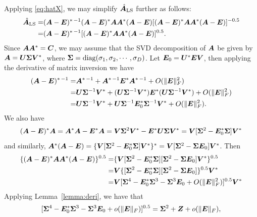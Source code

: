 


Applying \eqref{eq:hatX}, we may simplify $\hat{\bA}_{\text{LS}}$ further as follows:
\begin{align}
\hat{\bA}_{\text{LS}}=&(\bA-\bE)^{*\,-1}(\bA-\bE)^*\bA\bA^*(\bA-\bE)[(\bA-\bE)^*\bA\bA^*(\bA-\bE)]^{-0.5}
\nonumber\\=&(\bA-\bE)^{*\,-1}[(\bA-\bE)^*\bA\bA^*(\bA-\bE)]^{0.5}.\label{eq:expression1}
\end{align}
Since $\bA\bA^*=\bC$, we may assume that the SVD decomposition of $\bA$ be given by $\bA=\bU\bSigma\bV^*$, where $\bSigma=\diag(\sigma_1, \sigma_2, \cdots, \sigma_D)$. Let $\bE_0=\bU^*\bE\bV$, then applying the derivative of matrix inversion we have
\begin{align}\nonumber
(\bA-\bE)^{*\,-1}= &\bA^{*\,-1} + \bA^{*\,-1}\bE^* \bA^{*\,-1} + O(\|\bE\|_F^2)\\\nonumber=& \bU\bSigma^{-1}\bV^* + (\bU\bSigma^{-1}\bV^*)\bE^*(\bU\bSigma^{-1}\bV^*)  + O(\|\bE\|_F^2)\\=&  \bU\bSigma^{-1}\bV^* +\bU\bSigma^{-1}\bE_0^*\bSigma^{-1}\bV^* + O(\|\bE\|_F^2). \label{eq:expression2}
\end{align}
We also have
\begin{align*}
(\bA-\bE)^*\bA=\bA^*\bA-\bE^*\bA=\bV\bSigma^2\bV^*-\bE^*\bU\bSigma\bV^*=\bV[\bSigma^2-\bE_0^*\bSigma]\bV^*
\end{align*}
and similarly, $\bA^*(\bA-\bE)=\{\bV[\bSigma^2-\bE_0^*\bSigma]\bV^*\}^*=\bV[\bSigma^2-\bSigma\bE_0]\bV^*$.
Then
\begin{align}
\nonumber\{(\bA-\bE)^*\bA\bA^*(\bA-\bE)\}^{0.5}
=&\{\bV[\bSigma^2-\bE_0^*\bSigma][\bSigma^2-\bSigma\bE_0]\bV^*\}^{0.5}
\\\nonumber
=&\bV\{[\bSigma^2-\bE_0^*\bSigma][\bSigma^2-\bSigma\bE_0]\}^{0.5}\bV^*
\\=&\bV[\bSigma^4-\bE_0^*\bSigma^3-\bSigma^3\bE_0+O(\|\bE\|_F^2)]^{0.5}\bV^*\label{eq:expression3}
\end{align}
Applying Lemma~\ref{lemma:deri}, we have that 
\begin{equation}\label{eq:expression4}
[\bSigma^4-\bE_0^*\bSigma^3-\bSigma^3\bE_0+o(\|\bE\|_F)]^{0.5}
=\bSigma^2 + \bZ + o(\|\bE\|_F),
\end{equation}
